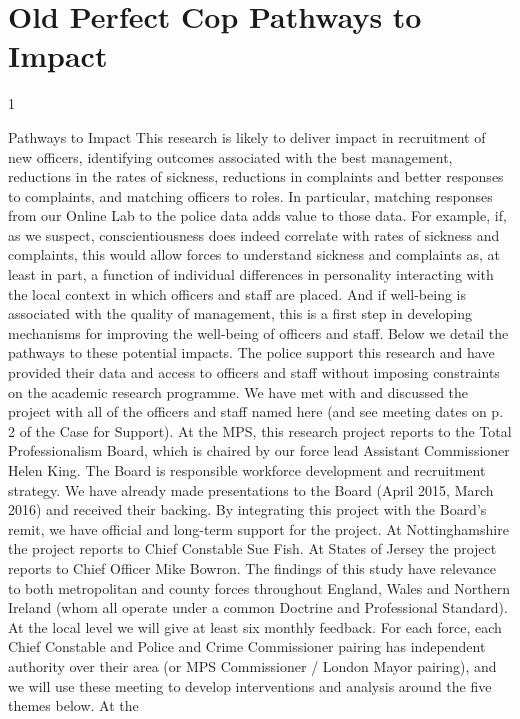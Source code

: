 \documentclass[11pt, a4paper]{article}
\begin{document}
\section{Old Perfect Cop Pathways to Impact}


1

Pathways to Impact
This research is likely to deliver impact in recruitment of new officers, identifying outcomes
associated with the best management, reductions in the rates of sickness, reductions in
complaints and better responses to complaints, and matching officers to roles. In particular,
matching responses from our Online Lab to the police data adds value to those data. For
example, if, as we suspect, conscientiousness does indeed correlate with rates of sickness
and complaints, this would allow forces to understand sickness and complaints as, at least in
part, a function of individual differences in personality interacting with the local context in
which officers and staff are placed. And if well-being is associated with the quality of
management, this is a first step in developing mechanisms for improving the well-being of
officers and staff. Below we detail the pathways to these potential impacts.
The police support this research and have provided their data and access to officers and
staff without imposing constraints on the academic research programme. We have met with
and discussed the project with all of the officers and staff named here (and see meeting
dates on p. 2 of the Case for Support). At the MPS, this research project reports to the Total
Professionalism Board, which is chaired by our force lead Assistant Commissioner Helen
King. The Board is responsible workforce development and recruitment strategy. We have
already made presentations to the Board (April 2015, March 2016) and received their
backing. By integrating this project with the Board’s remit, we have official and long-term
support for the project. At Nottinghamshire the project reports to Chief Constable Sue Fish.
At States of Jersey the project reports to Chief Officer Mike Bowron.
The findings of this study have relevance to both metropolitan and county forces throughout
England, Wales and Northern Ireland (whom all operate under a common Doctrine and
Professional Standard). At the local level we will give at least six monthly feedback. For each
force, each Chief Constable and Police and Crime Commissioner pairing has independent
authority over their area (or MPS Commissioner / London Mayor pairing), and we will use
these meeting to develop interventions and analysis around the five themes below. At the
\end{document}
